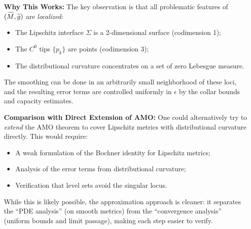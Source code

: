 \begin{remark}
\textbf{Why This Works:} The key observation is that all problematic features of $(\widetilde{M}, \widetilde{g})$ are \emph{localized}:
\begin{itemize}
    \item The Lipschitz interface $\Sigma$ is a 2-dimensional surface (codimension 1);
    \item The $C^0$ tips $\{p_k\}$ are points (codimension 3);
    \item The distributional curvature concentrates on a set of zero Lebesgue measure.
\end{itemize}
The smoothing can be done in an arbitrarily small neighborhood of these loci, and the resulting error terms are controlled uniformly in $\epsilon$ by the collar bounds and capacity estimates.

\textbf{Comparison with Direct Extension of AMO:} One could alternatively try to \emph{extend} the AMO theorem to cover Lipschitz metrics with distributional curvature directly. This would require:
\begin{itemize}
    \item A weak formulation of the Bochner identity for Lipschitz metrics;
    \item Analysis of the error terms from distributional curvature;
    \item Verification that level sets avoid the singular locus.
\end{itemize}
While this is likely possible, the approximation approach is cleaner: it separates the ``PDE analysis'' (on smooth metrics) from the ``convergence analysis'' (uniform bounds and limit passage), making each step easier to verify.
\end{remark}


